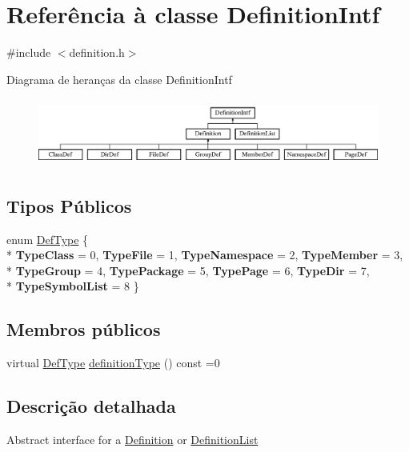 \hypertarget{class_definition_intf}{\section{Referência à classe Definition\-Intf}
\label{class_definition_intf}
}


{\ttfamily \#include $<$definition.\-h$>$}

Diagrama de heranças da classe Definition\-Intf\begin{figure}[H]
\begin{center}
\leavevmode
\includegraphics[height=2.264151cm]{class_definition_intf}
\end{center}
\end{figure}
\subsection*{Tipos Públicos}
\begin{DoxyCompactItemize}
\item 
enum \hyperlink{class_definition_intf_a2dc566dfec40397b2990e6520536ecb5}{Def\-Type} \{ \\*
{\bfseries Type\-Class} = 0, 
{\bfseries Type\-File} = 1, 
{\bfseries Type\-Namespace} = 2, 
{\bfseries Type\-Member} = 3, 
\\*
{\bfseries Type\-Group} = 4, 
{\bfseries Type\-Package} = 5, 
{\bfseries Type\-Page} = 6, 
{\bfseries Type\-Dir} = 7, 
\\*
{\bfseries Type\-Symbol\-List} = 8
 \}
\end{DoxyCompactItemize}
\subsection*{Membros públicos}
\begin{DoxyCompactItemize}
\item 
virtual \hyperlink{class_definition_intf_a2dc566dfec40397b2990e6520536ecb5}{Def\-Type} \hyperlink{class_definition_intf_afba7add835518dbf4202846446d667b0}{definition\-Type} () const =0
\end{DoxyCompactItemize}


\subsection{Descrição detalhada}
Abstract interface for a \hyperlink{class_definition}{Definition} or \hyperlink{class_definition_list}{Definition\-List} 

